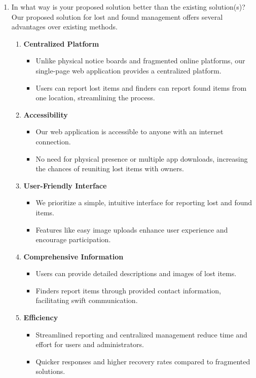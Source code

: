 \documentclass[14pt]{article}
\begin{document}
\begin{enumerate}
\item In what way is your proposed solution better than the existing solution(s)?\\
\tabto{.5cm}Our proposed solution for lost and found management offers several advantages
over existing methods.
\begin{enumerate}
\item \textbf{Centralized Platform}
\begin{itemize}
\item Unlike physical notice boards and fragmented online platforms, our single-page web application provides a centralized platform.
\item Users can report lost items and finders can report found items from one location, streamlining the process.
\end{itemize}
\item \textbf{Accessibility}
\begin{itemize}
\item Our web application is accessible to anyone with an internet connection.
\item No need for physical presence or multiple app downloads, increasing the
chances of reuniting lost items with owners.
\end{itemize}
\item \textbf{User-Friendly Interface}
\begin{itemize}
\item We prioritize a simple, intuitive interface for reporting lost and found
items. 
\item Features like easy image uploads enhance user experience and encourage
participation.
\end{itemize}
\item \textbf{Comprehensive Information}
\begin{itemize}
\item Users can provide detailed descriptions and images of lost items.
\item Finders report items through provided contact information, facilitating
swift communication.
\end{itemize}
\item \textbf{Efficiency}
\begin{itemize}
\item Streamlined reporting and centralized management reduce time and effort for users and administrators. 
\item Quicker responses and higher recovery rates compared to fragmented
solutions.
\end{itemize}

\end{enumerate}
\end{enumerate}
\end{document}

